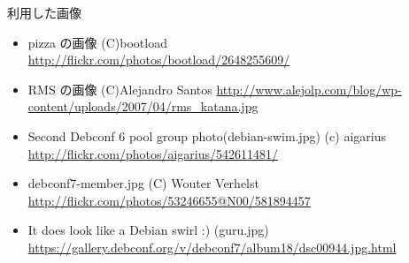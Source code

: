\documentclass[cjk,dvipdfmx,12pt]{beamer}
\begin{document}
\begin{frame}{利用した画像}
\begin{itemize}
\item pizza の画像 (C)bootload\\
\url{http://flickr.com/photos/bootload/2648255609/}
\item RMS の画像 (C)Alejandro Santos
\url{http://www.alejolp.com/blog/wp-content/uploads/2007/04/rms_katana.jpg}
\item Second Debconf 6 pool group photo(debian-swim.jpg) (c) aigarius
\url{http://flickr.com/photos/aigarius/542611481/}
\item debconf7-member.jpg (C) Wouter Verhelst
\url{http://flickr.com/photos/53246655@N00/581894457}
\item It does look like a Debian swirl :) (guru.jpg)
\url{https://gallery.debconf.org/v/debconf7/album18/dsc00944.jpg.html}
\end{itemize}

\end{frame}
\end{document}

